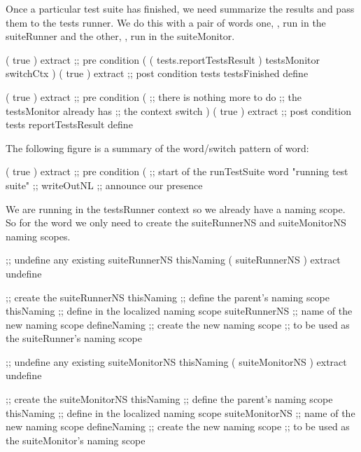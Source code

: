 Once a particular test suite has finished, we need summarize the results 
and pass them to the tests runner. We do this with a pair of words one, 
, run in the suiteRunner and the other, 
, run in the suiteMonitor. 

\startJoylolCode
( { true } ) extract ;; pre condition
(
  ( tests.reportTestsResult )
  testsMonitor
  switchCtx
)
( { true } ) extract ;; post condition
tests
testsFinished
define
\stopJoylolCode

\startJoylolCode
( { true } ) extract ;; pre condition
(
          ;; there is nothing more to do
          ;; the testsMonitor already has
          ;; the context switch 
)
( { true } ) extract ;; post condition
tests
reportTestsResult
define
\stopJoylolCode

\stopTestSuite


The following figure is a summary of the word/switch pattern of 
 word: 


\startJoylolCode
( { true } ) extract ;; pre condition
(                       ;; start of the runTestSuite word
  "running test suite"  ;;
  writeOutNL            ;; announce our presence
\stopJoylolCode

We are running in the testsRunner context so we already have a 
 naming scope. So for the  word we 
only need to create the suiteRunnerNS and suiteMonitorNS naming scopes. 

\startJoylolCode
  ;; undefine any existing suiteRunnerNS
  thisNaming
  ( suiteRunnerNS ) extract
  undefine

  ;; create the suiteRunnerNS
  thisNaming    ;; define the parent's naming scope
  thisNaming    ;; define in the localized naming scope
  suiteRunnerNS ;; name of the new naming scope
  defineNaming  ;; create the new naming scope
                ;; to be used as the suiteRunner's naming scope
\stopJoylolCode

\startJoylolCode
  ;; undefine any existing suiteMonitorNS
  thisNaming
  ( suiteMonitorNS ) extract
  undefine

  ;; create the suiteMonitorNS
  thisNaming      ;; define the parent's naming scope
  thisNaming      ;; define in the localized naming scope
  suiteMonitorNS  ;; name of the new naming scope
  defineNaming    ;; create the new naming scope
                  ;; to be used as the suiteMonitor's naming scope
\stopJoylolCode

